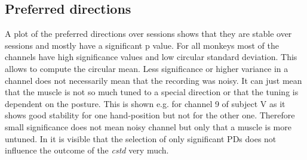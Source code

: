\subsection{Preferred directions} %
\label{sg:sub:preferred_directions}
A plot of the preferred directions over sessions shows that they are stable over sessions and mostly have a significant p value. For all monkeys most of the channels have high significance values and low circular standard deviation. This allows to compute the circular mean. Less significance or higher variance in a channel does not necessarily mean that the recording was noisy. It can just mean that the muscle is not so much tuned to a special direction or that the tuning is dependent on the posture. This is shown e.g. for channel 9 of subject V  as it shows good stability for one hand-position but not for the other one. Therefore small significance does not mean noisy channel but only that a muscle is more untuned. In  it is visible that the selection of only significant PDs does not influence the outcome of the \emph{cstd} very much.

